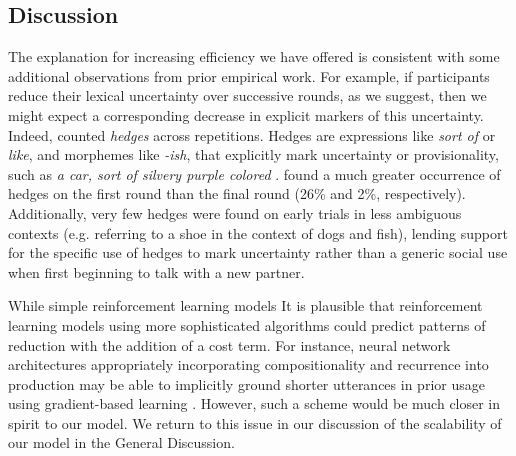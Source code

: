


\subsection{Discussion}

The explanation for increasing efficiency we have offered is consistent with some additional observations from prior empirical work.
For example, if participants reduce their lexical uncertainty over successive rounds, as we suggest, then we might expect a corresponding decrease in explicit markers of this uncertainty. 
Indeed,  counted \emph{hedges} across repetitions.
Hedges are expressions like \emph{sort of} or \emph{like}, and morphemes like \emph{-ish}, that explicitly mark uncertainty or provisionality, such as \emph{a car, sort of silvery purple colored} \cite{BrennanClark96_ConceptualPactsConversation,Fraser10_Hedging,MedlockBriscoe07_HedgeClassification}.
 found a much greater occurrence of hedges on the first round than the final round (26\% and 2\%, respectively).
Additionally, very few hedges were found on early trials in less ambiguous contexts (e.g. referring to a shoe in the context of dogs and fish), lending support for the specific use of hedges to mark uncertainty rather than a generic social use when first beginning to talk with a new partner.

While simple reinforcement learning models It is plausible that reinforcement learning models using more sophisticated algorithms could predict patterns of reduction with the addition of a cost term. 
For instance, neural network architectures appropriately incorporating compositionality and recurrence into production may be able to implicitly ground shorter utterances in prior usage using gradient-based learning \cite{hawkins2019continual}.
However, such a scheme would be much closer in spirit to our model.
We return to this issue in our discussion of the scalability of our model in the General Discussion.

